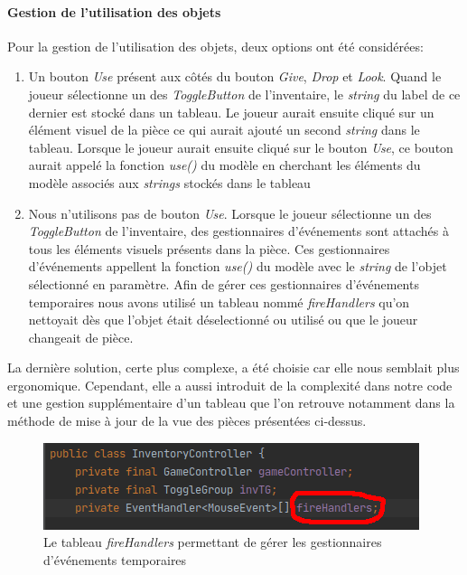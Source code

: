 \documentclass[./standalone.tex]{subfiles}
\begin{document}
\paragraph{Gestion de l'utilisation des objets\\}

Pour la gestion de l'utilisation des objets, deux options ont été considérées:
\begin{enumerate}
	\item Un bouton \textit{Use} présent aux côtés du bouton \textit{Give}, \textit{Drop} et \textit{Look}. Quand le joueur sélectionne un des \textit{ToggleButton} de l'inventaire, le \textit{string} du label de ce dernier est stocké dans un tableau. Le joueur aurait ensuite cliqué sur un élément visuel de la pièce ce qui aurait ajouté un second \textit{string} dans le tableau. Lorsque le joueur aurait ensuite cliqué sur le bouton \textit{Use}, ce bouton aurait appelé la fonction \textit{use()} du modèle en cherchant les éléments du modèle associés aux \textit{strings} stockés dans le tableau
	\item Nous n'utilisons pas de bouton \textit{Use}. Lorsque le joueur sélectionne un des \textit{ToggleButton} de l'inventaire, des gestionnaires d'événements sont attachés à tous les éléments visuels présents dans la pièce. Ces gestionnaires d'événements appellent la fonction \textit{use()} du modèle avec le \textit{string} de l'objet sélectionné en paramètre. Afin de gérer ces gestionnaires d'événements temporaires nous avons utilisé un tableau nommé \textit{fireHandlers} qu'on nettoyait dès que l'objet était déselectionné ou utilisé ou que le joueur changeait de pièce.\\
\end{enumerate}

La dernière solution, certe plus complexe, a été choisie car elle nous semblait plus ergonomique. Cependant, elle a aussi introduit de la complexité dans notre code et une gestion supplémentaire d'un tableau que l'on retrouve notamment dans la méthode de mise à jour de la vue des pièces présentées ci-dessus.
\begin{center}
	\begin{figure}[h!]
	\includegraphics[scale=1]{images/fireHandlers.png}
	\caption{Le tableau \textit{fireHandlers} permettant de gérer les gestionnaires d'événements temporaires}
	\label{fireHandlers}
	\end{figure}
\end{center}
\end{document}
